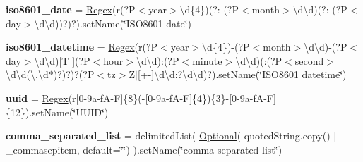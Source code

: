 \begin{DoxyCompactItemize}
\item 
\mbox{\label{classsetuptools_1_1__vendor_1_1pyparsing_1_1pyparsing__common_a7efaf319aada3e7591ef7d4c148a0c19}} 
{\bfseries iso8601\+\_\+date} = \hyperlink{classsetuptools_1_1__vendor_1_1pyparsing_1_1_regex}{Regex}(r\textquotesingle{}(?P$<$year$>$\textbackslash{}d\{4\})(?\+:-\/(?P$<$month$>$\textbackslash{}d\textbackslash{}d)(?\+:-\/(?P$<$day$>$\textbackslash{}d\textbackslash{}d))?)?\textquotesingle{}).set\+Name(\char`\"{}I\+S\+O8601 date\char`\"{})
\item 
\mbox{\label{classsetuptools_1_1__vendor_1_1pyparsing_1_1pyparsing__common_a8a197277c3df9b9adeb4ee023c4f5103}} 
{\bfseries iso8601\+\_\+datetime} = \hyperlink{classsetuptools_1_1__vendor_1_1pyparsing_1_1_regex}{Regex}(r\textquotesingle{}(?P$<$year$>$\textbackslash{}d\{4\})-\/(?P$<$month$>$\textbackslash{}d\textbackslash{}d)-\/(?P$<$day$>$\textbackslash{}d\textbackslash{}d)\mbox{[}T \mbox{]}(?P$<$hour$>$\textbackslash{}d\textbackslash{}d)\+:(?P$<$minute$>$\textbackslash{}d\textbackslash{}d)(\+:(?P$<$second$>$\textbackslash{}d\textbackslash{}d(\textbackslash{}.\textbackslash{}d$\ast$)?)?)?(?P$<$tz$>$Z$\vert$\mbox{[}+-\/\mbox{]}\textbackslash{}d\textbackslash{}d\+:?\textbackslash{}d\textbackslash{}d)?\textquotesingle{}).set\+Name(\char`\"{}I\+S\+O8601 datetime\char`\"{})
\item 
\mbox{\label{classsetuptools_1_1__vendor_1_1pyparsing_1_1pyparsing__common_a7a6f96f9010b9f139c118a80a61ef6f2}} 
{\bfseries uuid} = \hyperlink{classsetuptools_1_1__vendor_1_1pyparsing_1_1_regex}{Regex}(r\textquotesingle{}\mbox{[}0-\/9a-\/f\+A-\/\+F\mbox{]}\{8\}(-\/\mbox{[}0-\/9a-\/f\+A-\/\+F\mbox{]}\{4\})\{3\}-\/\mbox{[}0-\/9a-\/f\+A-\/\+F\mbox{]}\{12\}\textquotesingle{}).\+set\+Name(\char`\"{}\+U\+U\+I\+D\char`\"{})
\item 
\mbox{\label{classsetuptools_1_1__vendor_1_1pyparsing_1_1pyparsing__common_a04dc0d91b9cd70ab9f46b65302681d5a}} 
{\bfseries comma\+\_\+separated\+\_\+list} = delimited\+List( \hyperlink{classsetuptools_1_1__vendor_1_1pyparsing_1_1_optional}{Optional}( quoted\+String.\+copy() $\vert$ \+\_\+commasepitem, default=\char`\"{}\char`\"{}) ).set\+Name(\char`\"{}comma separated list\char`\"{})

\end{DoxyCompactItemize}
